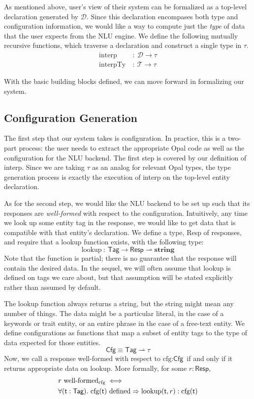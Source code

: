 \documentclass[twocolumn]{article}
\newcommand{\fcy}[1]{\mathcal{#1}}
\newcommand{\etag}[1]{\textsf{#1}}
\begin{document}
As mentioned above, user's view of their system can be formalized as a top-level
declaration generated by $\fcy{D}$. Since this declaration encompases both type
and configuration information, we would like a way to compute just the
\emph{type} of data that the user expects from the NLU engine. We define the
following mutually recursive functions, which traverse a declaration and
construct a single type in $\tau$.
\begin{align*}
  \text{interp}\ &:\ \fcy{D} \to \tau \\
  \text{interpTy}\ &:\ \fcy{T} \to \tau
\end{align*}

With the basic building blocks defined, we can move forward in formalizing our
system. 

\subsection{Configuration Generation}
The first step that our system takes is configuration. In practice, this is a
two-part process: the user needs to extract the appropriate Opal code as well as
the configuration for the NLU backend. The first step is covered by our
definition of interp. Since we are taking $\tau$ as an analog for relevant Opal
types, the type generation process is exactly the execution of interp on the
top-level entity declaration.

As for the second step, we would like the NLU backend to be set up such that its
responses are \emph{well-formed} with respect to the configuration. Intuitively,
any time we look up some entity tag in the response, we would like to get data
that is compatible with that entity's declaration. We define a type,
\textsf{Resp} of responses, and require that a lookup function exists, with the
following type:
$$ \text{lookup}\ :\ \textsf{Tag} \to \textsf{Resp} \rightharpoonup
\textbf{string} $$
Note that the function is partial; there is no guarantee that the response will
contain the desired data. In the sequel, we will often assume that lookup is
defined on tags we care about, but that assumption will be stated explicitly
rather than assumed by default.

The lookup function always returns a string, but the string might mean any
number of things. The data might be a particular literal, in the case of a
keywords or trait entity, or an entire phrase in the case of a free-text entity.
We define configurations as functions that map a subset of entity tags to the
type of data expected for those entities.
$$ \textsf{Cfg} \equiv \textsf{Tag} \rightharpoonup \tau $$
Now, we call a response well-formed with respect to $\text{cfg} : \textsf{Cfg}$
if and only if it returns appropriate data on lookup. More formally, for some $r
: \textsf{Resp}$,
\begin{align*}
  &r\ \text{well-formed}_{\text{cfg}} \iff \\
  &\forall (\etag{t} : \textsf{Tag}).\ \text{cfg}(\etag{t})\ \text{defined} \Rightarrow \text{lookup}(\etag{t}, r) : \text{cfg(\etag{t})}
\end{align*}
\end{document}
